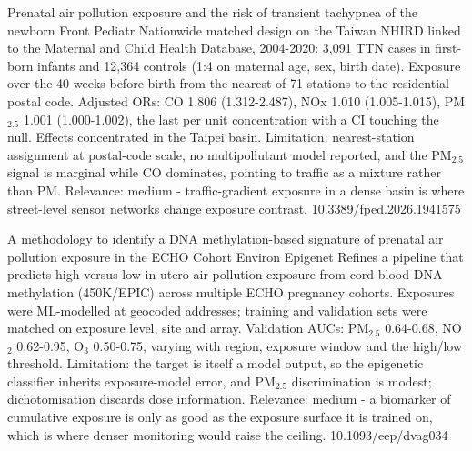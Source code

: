 \documentclass[10pt]{article}
\begin{document}
{Prenatal air pollution exposure and the risk of transient tachypnea of the newborn}
{Front Pediatr}
{Nationwide matched design on the Taiwan NHIRD linked to the Maternal and Child Health Database, 2004-2020: 3,091 TTN cases in first-born infants and 12,364 controls (1:4 on maternal age, sex, birth date). Exposure over the 40 weeks before birth from the nearest of 71 stations to the residential postal code. Adjusted ORs: CO 1.806 (1.312-2.487), NOx 1.010 (1.005-1.015), PM$_{2.5}$ 1.001 (1.000-1.002), the last per unit concentration with a CI touching the null. Effects concentrated in the Taipei basin. Limitation: nearest-station assignment at postal-code scale, no multipollutant model reported, and the PM$_{2.5}$ signal is marginal while CO dominates, pointing to traffic as a mixture rather than PM. Relevance: medium - traffic-gradient exposure in a dense basin is where street-level sensor networks change exposure contrast.}
{10.3389/fped.2026.1941575}

{A methodology to identify a DNA methylation-based signature of prenatal air pollution exposure in the ECHO Cohort}
{Environ Epigenet}
{Refines a pipeline that predicts high versus low in-utero air-pollution exposure from cord-blood DNA methylation (450K/EPIC) across multiple ECHO pregnancy cohorts. Exposures were ML-modelled at geocoded addresses; training and validation sets were matched on exposure level, site and array. Validation AUCs: PM$_{2.5}$ 0.64-0.68, NO$_2$ 0.62-0.95, O$_3$ 0.50-0.75, varying with region, exposure window and the high/low threshold. Limitation: the target is itself a model output, so the epigenetic classifier inherits exposure-model error, and PM$_{2.5}$ discrimination is modest; dichotomisation discards dose information. Relevance: medium - a biomarker of cumulative exposure is only as good as the exposure surface it is trained on, which is where denser monitoring would raise the ceiling.}
{10.1093/eep/dvag034}

\par{}\baselineskip{}\baselineskip
{}
\end{document}
